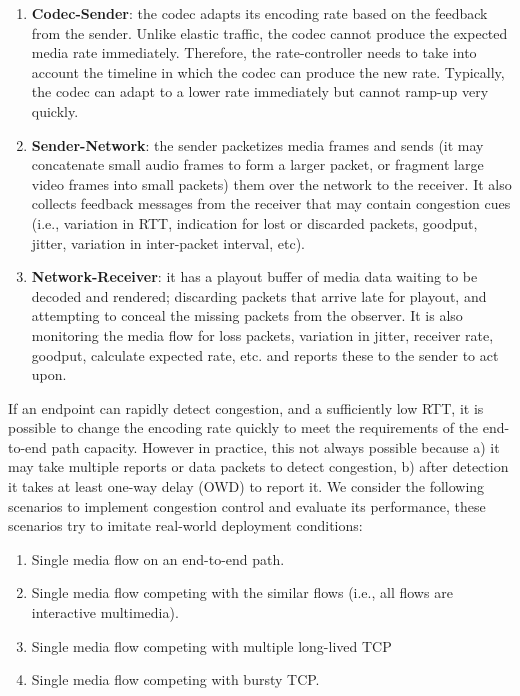 \begin{enumerate}

\item \textbf{Codec-Sender}: the codec adapts its encoding rate based on the feedback
from the sender. Unlike elastic traffic, the codec cannot produce the expected
media rate immediately. Therefore, the rate-controller needs to take into
account the timeline in which the codec can produce the new rate. Typically,
the codec can adapt to a lower rate immediately but cannot ramp-up very
quickly.

\item \textbf{Sender-Network}: the sender packetizes media frames and sends
(it may concatenate small audio frames to form a larger packet, or fragment
large video frames into small packets) them over the network to the receiver.
It also collects feedback messages from the receiver that may contain
congestion cues (i.e., variation in RTT, indication for lost or discarded
packets, goodput, jitter, variation in inter-packet interval, etc).

\item \textbf{Network-Receiver}: it has a playout buffer of media data waiting
to be decoded and rendered; discarding packets that arrive late for playout,
and attempting to conceal the missing packets from the observer. It is  also
monitoring the media flow for loss packets, variation in jitter, receiver
rate, goodput, calculate expected rate, etc. and reports these to the sender
to act upon.

\end{enumerate}

If an endpoint can rapidly detect congestion, and a sufficiently low RTT, it
is possible to change the encoding rate quickly to meet the requirements of
the end-to-end path capacity. However in practice, this not always possible
because a) it may take multiple reports or data packets to detect congestion,
b) after detection it takes at least one-way delay (OWD) to report it. We
consider the following scenarios to implement congestion control and evaluate
its performance, these scenarios try to imitate real-world deployment
conditions:

\begin{enumerate}
\item Single media flow on an end-to-end path.
\item Single media flow competing with the similar flows (i.e., all flows are
interactive multimedia).
\item Single media flow competing with multiple long-lived TCP
\item Single media flow competing with bursty TCP.
\end{enumerate}

